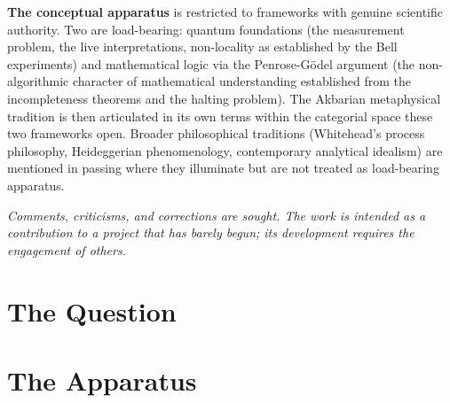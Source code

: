 \documentclass[11pt,a4paper,openany]{book}
\theoremstyle{cleanrm}
\begin{document}
\vspace{0.3in}
\noindent\textbf{The conceptual apparatus} is restricted to frameworks
with genuine scientific authority. Two are load-bearing: quantum
foundations (the measurement problem, the live interpretations,
non-locality as established by the Bell experiments) and mathematical
logic via the Penrose-G\"odel argument (the non-algorithmic character of
mathematical understanding established from the incompleteness theorems
and the halting problem). The Akbarian metaphysical tradition is then
articulated in its own terms within the categorial space these two
frameworks open. Broader philosophical traditions (Whitehead's process
philosophy, Heideggerian phenomenology, contemporary analytical idealism)
are mentioned in passing where they illuminate but are not treated as
load-bearing apparatus.

\vspace{0.3in}
\noindent\textit{Comments, criticisms, and corrections are sought. The
work is intended as a contribution to a project that has barely begun;
its development requires the engagement of others.}
\cleardoublepage

\tableofcontents
\cleardoublepage



\mainmatter

\part{The Question}



\part{The Apparatus}

\end{document}
